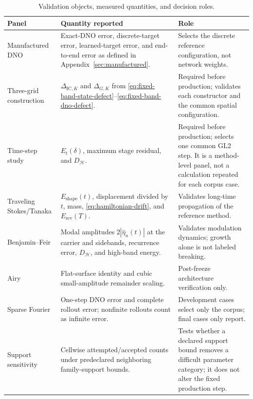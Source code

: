 \documentclass[11pt]{article}
\begin{document}
\begin{table}[ht]
  \centering
  \caption{Validation objects, measured quantities, and decision roles.}
  \label{tab:validation-roles}
  \small
  \begin{tabularx}{\textwidth}{
    @{}>{\raggedright\arraybackslash}p{}
       >{\raggedright\arraybackslash}X
       >{\raggedright\arraybackslash}p{}@{}}
    \toprule
    Panel & Quantity reported & Role \\
    \midrule
    Manufactured DNO
      & Exact-DNO error, discrete-target error, learned-target error, and
        end-to-end error as defined in Appendix~\ref{sec:manufactured}.
      & Selects the discrete reference configuration, not network weights. \\
    Three-grid construction
      & $\Delta_{\mathrm{IC},K}$ and $\Delta_{G,K}$ from
        \eqref{eq:fixed-band-state-defect}--\eqref{eq:fixed-band-dno-defect}.
      & Required before production; validates each constructor and the common
        spatial configuration. \\
    Time-step study
      & $E_t(\delta)$, maximum stage residual, and $D_{\mathcal H}$.
      & Required before production; selects one common GL2 step.  It is a
        method-level panel, not a calculation repeated for each corpus case. \\
    Traveling Stokes/Tanaka
      & $E_{\mathrm{shape}}(t)$, displacement divided by $t$, mass,
        \eqref{eq:hamiltonian-drift}, and $E_{\mathrm{rev}}(T)$.
      & Validates long-time propagation of the reference method. \\
    Benjamin--Feir
      & Modal amplitudes $2|\widehat\eta_n(t)|$ at the carrier and sidebands,
        recurrence error, $D_{\mathcal H}$, and high-band energy.
      & Validates modulation dynamics; growth alone is not labeled breaking. \\
    Airy
      & Flat-surface identity and cubic small-amplitude remainder scaling.
      & Post-freeze architecture verification only. \\
    Sparse Fourier
      & One-step DNO error and complete rollout error; nonfinite rollouts
        count as infinite error.
      & Development cases select only the corpus; final cases only report. \\
    Support sensitivity
      & Cellwise attempted/accepted counts under predeclared neighboring
        family-support bounds.
      & Tests whether a declared support bound removes a difficult parameter
        category; it does not alter the fixed production step. \\
    \bottomrule
  \end{tabularx}
\end{table}
\end{document}
